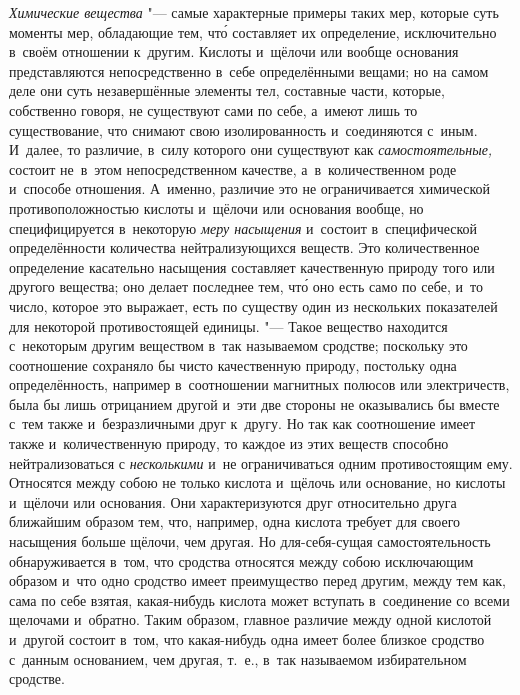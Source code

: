 {\em Химические вещества} "--- самые характерные примеры таких мер, которые
суть моменты мер, обладающие тем, чт\'{о} составляет их определение,
исключительно в~своём отношении к~другим. Кислоты и~щёлочи или
вообще основания представляются непосредственно в~себе определёнными вещами; но
на самом деле они суть незавершённые элементы тел, составные части, которые,
собственно говоря, не существуют сами по себе, а~имеют лишь то существование,
что снимают свою изолированность и~соединяются с~иным. И~далее, то различие,
в~силу которого они существуют как {\em самостоятельные,} состоит не~в~этом
непосредственном качестве, а~в~количественном роде и~способе отношения.
А~именно, различие это не ограничивается химической противоположностью кислоты
и~щёлочи или основания вообще, но специфицируется в~некоторую
{\em меру насыщения} и~состоит в~специфической определённости количества
нейтрализующихся веществ. Это количественное определение касательно насыщения
составляет качественную природу того или другого вещества; оно делает последнее
тем, чт\'{о} оно есть само по себе, и~то число, которое это выражает, есть по
существу один из нескольких показателей для некоторой противостоящей единицы.
"--- Такое вещество находится с~некоторым другим веществом в~так называемом
сродстве; поскольку это соотношение сохраняло бы чисто качественную природу,
постольку одна определённость, например в~соотношении магнитных полюсов или
электричеств, была бы лишь отрицанием другой и~эти две стороны не оказывались
бы вместе с~тем также и~безразличными друг к~другу. Но так как соотношение
имеет также и~количественную природу, то каждое из этих веществ способно
нейтрализоваться с {\em несколькими} и~не ограничиваться одним противостоящим
ему. Относятся между собою не только кислота и~щёлочь или основание, но кислоты
и~щёлочи или основания. Они характеризуются друг относительно друга ближайшим
образом тем, что, например, одна кислота требует для своего насыщения больше
щёлочи, чем другая. Но для-себя-сущая самостоятельность обнаруживается в~том,
что сродства относятся между собою исключающим образом и~что одно сродство
имеет преимущество перед другим, между тем как, сама по себе взятая,
какая-нибудь кислота может вступать в~соединение со всеми щелочами и~обратно.
Таким образом, главное различие между одной кислотой и~другой состоит в~том,
что какая-нибудь одна имеет более близкое сродство с~данным основанием, чем
другая, т.~е., в~так называемом избирательном сродстве.

